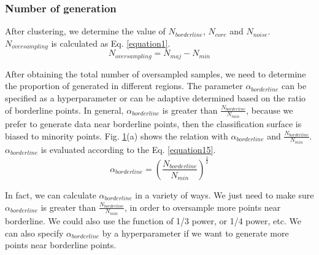\documentclass[runningheads]{llncs}
\begin{document}
\subsubsection{Number of generation}
After clustering, 
we determine the value of $N_{borderline}$, 
$N_{core}$ and $N_{noise}$. 
$N_{oversampling}$ is calculated as Eq. \ref{equation1}.
\begin{equation}
  \label{equation1}
  N_{oversampling}=N_{maj}-N_{min}
\end{equation}

After obtaining the total number of oversampled samples, 
we need to determine the proportion of generated 
in different regions.
The parameter $\alpha_{borderline}$ can be specified as a 
hyperparameter or can be adaptive determined based
 on the ratio of borderline points.
In general, $\alpha_{borderline}$ is greater than $\frac{N_{borderline}}{N_{min}}$,
because we prefer to generate data near borderline points,
then the classification surface is biased to minority points.
Fig. \ref{fig20}(a) shows the relation with $\alpha_{borderline}$ and $\frac{N_{borderline}}{N_{min}}$.
$\alpha_{borderline}$ is evaluated according to the Eq. \ref{equation15}.
\begin{equation}
  \label{equation15}
  \alpha_{borderline}=(\frac{N_{borderline}}{N_{min}})^{\frac{1}{2}}
\end{equation}

In fact, we can calculate $\alpha_{borderline}$ in a variety of ways. 
We just need to make sure $\alpha_{borderline}$ is greater 
than $\frac{N_{borderline}}{N_{min}}$, in order
to oversample more points near borderline. 
We could also use the function of 1/3 power, or 1/4 power, etc.
We can also specify $\alpha_{borderline}$ by a hyperparameter
if we want to generate more points near borderline points.
\begin{figure}[tb]
    \centering
    \quad
    \caption{}
    \label{fig20}
    \end{figure}
  
\end{document}
